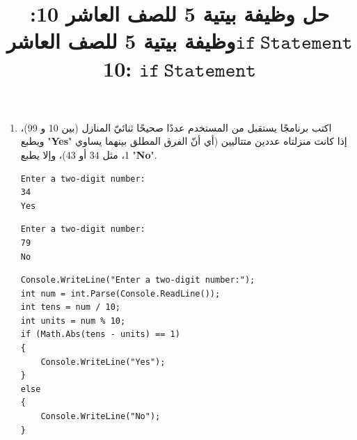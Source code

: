 ﻿\documentclass[14pt]{extarticle}
\title{حل وظيفة بيتية 5 للصف العاشر 10: $\mathtt{if\ Statement}$}
\title{وظيفة بيتية 5 للصف العاشر 10: $\mathtt{if\ Statement}$}
\begin{document}
\maketitle
\thispagestyle{fancy}

\begin{enumerate}[itemsep=3em]

\item
اكتب برنامجًا يستقبل من المستخدم عددًا صحيحًا ثنائيّ المنازل (بين 10 و 99)، ويطبع "\textbf{\textenglish{Yes}}" إذا كانت منزلتاه عددين متتاليين (أي أنّ الفرق المطلق بينهما يساوي 1، مثل 34 أو 43)، وإلا يطبع "\textbf{\textenglish{No}}".
\ifdetailed
\begin{boxExample}[1]
\begin{english}
\begin{verbatim}
Enter a two-digit number:
34
Yes
\end{verbatim}
\end{english}
\end{boxExample}
\begin{boxExample}[2]
\begin{english}
\begin{verbatim}
Enter a two-digit number:
79
No
\end{verbatim}
\end{english}
\end{boxExample}
\fi
\ifwithsols
\begin{boxSolution}
\begin{english}
\begin{verbatim}
Console.WriteLine("Enter a two-digit number:");
int num = int.Parse(Console.ReadLine());
int tens = num / 10;
int units = num % 10;
if (Math.Abs(tens - units) == 1)
{
    Console.WriteLine("Yes");
}
else
{
    Console.WriteLine("No");
}
\end{verbatim}
\end{english}
\end{boxSolution}
\fi
\clearpage


\end{enumerate}
\end{document}
